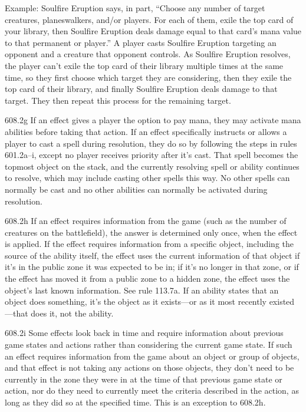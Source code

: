Example: Soulfire Eruption says, in part, “Choose any number of target creatures, planeswalkers, and/or players. For each of them, exile the top card of your library, then Soulfire Eruption deals damage equal to that card’s mana value to that permanent or player.” A player casts Soulfire Eruption targeting an opponent and a creature that opponent controls. As Soulfire Eruption resolves, the player can’t exile the top card of their library multiple times at the same time, so they first choose which target they are considering, then they exile the top card of their library, and finally Soulfire Eruption deals damage to that target. They then repeat this process for the remaining target.

608.2g If an effect gives a player the option to pay mana, they may activate mana abilities before taking that action. If an effect specifically instructs or allows a player to cast a spell during resolution, they do so by following the steps in rules 601.2a–i, except no player receives priority after it’s cast. That spell becomes the topmost object on the stack, and the currently resolving spell or ability continues to resolve, which may include casting other spells this way. No other spells can normally be cast and no other abilities can normally be activated during resolution.

608.2h If an effect requires information from the game (such as the number of creatures on the battlefield), the answer is determined only once, when the effect is applied. If the effect requires information from a specific object, including the source of the ability itself, the effect uses the current information of that object if it’s in the public zone it was expected to be in; if it’s no longer in that zone, or if the effect has moved it from a public zone to a hidden zone, the effect uses the object’s last known information. See rule 113.7a. If an ability states that an object does something, it’s the object as it exists—or as it most recently existed—that does it, not the ability.

608.2i Some effects look back in time and require information about previous game states and actions rather than considering the current game state. If such an effect requires information from the game about an object or group of objects, and that effect is not taking any actions on those objects, they don’t need to be currently in the zone they were in at the time of that previous game state or action, nor do they need to currently meet the criteria described in the action, as long as they did so at the specified time. This is an exception to 608.2h.

